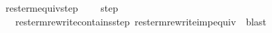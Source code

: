 \ res{\isacharunderscore}term{\isacharunderscore}equiv{\isacharunderscore}step{\isacharcolon}\isanewline
\ \ {\isachardoublequoteopen}\ {\isasymsim}\ step\ \isanewline
\ \ \ res{\isacharunderscore}term{\isacharunderscore}rewrite{\isacharunderscore}contains{\isacharunderscore}step\ res{\isacharunderscore}term{\isacharunderscore}rewrite{\isacharunderscore}imp{\isacharunderscore}equiv\ \ blast%

